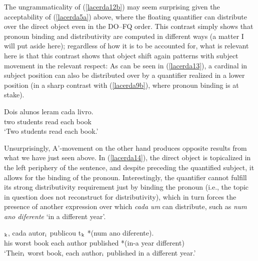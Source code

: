 \documentclass[output=paper]{langscibook}
\begin{document}
The ungrammaticality of (\ref{lacerda12b}) may seem surprising given the acceptability of (\ref{lacerda5a}) above, where the floating quantifier can distribute over the direct object even in the DO--FQ order. This contrast simply shows that pronoun binding and distributivity are computed in different ways (a matter I will put aside here); regardless of how it is to be accounted for, what is relevant here is that this contrast shows that object shift again patterns with subject movement in the relevant respect: As can be seen in (\ref{lacerda13}), a cardinal in subject position can also be distributed over by a quantifier realized in a lower position (in a sharp contrast with (\ref{lacerda9b}), where pronoun binding is at stake).

\begin{exe}
\ex \label{lacerda13}
\gll Dois 	alunos 	leram 	cada 	livro.\\
two	students	read	each	book\\
\glt‘Two students read each book.’
\end{exe}

Unsurprisingly, A’-movement on the other hand produces opposite results from what we have just seen above. In (\ref{lacerda14}), the direct object is topicalized in the left periphery of the sentence, and despite preceding the quantified subject, it allows for the binding of the pronoun. Interestingly, the quantifier cannot fulfill its strong distributivity requirement just by binding the pronoun (i.e., the topic in question does not reconstruct for distributivity), which in turn forces the presence of another expression over which \emph{cada um} can distribute, such as \emph{num ano diferente} ‘in a different year’.

\begin{exe}
\ex \label{lacerda14}
$_{\textnormal{k}}$,	cada	autor$_{\textnormal{i}}$	publicou	t$_{\textnormal{k}}$ 	*(num	ano	diferente).\\
his	worst	book	each	author	published	{}	*(in-a	year	different)\\
\glt‘Their$_{\textnormal{i}}$ worst book, each author$_{\textnormal{i}}$ published in a different year.’
\end{exe}
\end{document}
